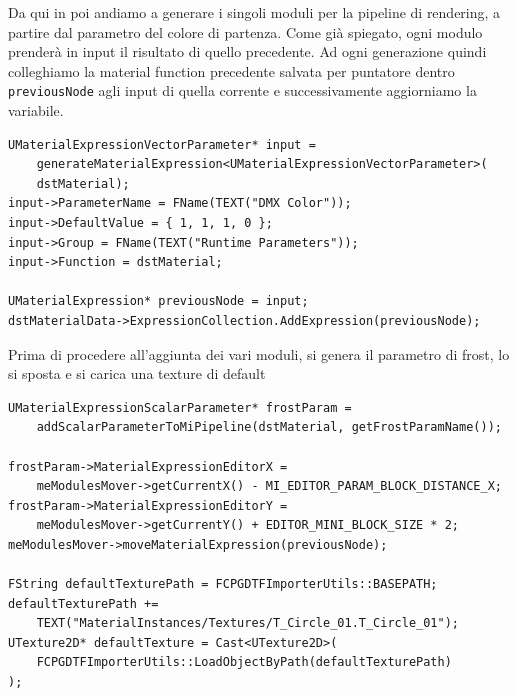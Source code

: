 \documentclass[main.tex]{subfiles}
\begin{document}
Da qui in poi andiamo a generare i singoli moduli per la pipeline di rendering, a partire dal parametro del colore di partenza. Come già spiegato, ogni modulo prenderà in input il risultato di quello precedente. Ad ogni generazione quindi colleghiamo la material function precedente salvata per puntatore dentro \lstinline{previousNode} agli input di quella corrente e successivamente aggiorniamo la variabile.
\begin{lstlisting}
UMaterialExpressionVectorParameter* input =
    generateMaterialExpression<UMaterialExpressionVectorParameter>(
    dstMaterial);
input->ParameterName = FName(TEXT("DMX Color"));
input->DefaultValue = { 1, 1, 1, 0 };
input->Group = FName(TEXT("Runtime Parameters"));
input->Function = dstMaterial;

UMaterialExpression* previousNode = input;
dstMaterialData->ExpressionCollection.AddExpression(previousNode);
\end{lstlisting}
Prima di procedere all'aggiunta dei vari moduli, si genera il parametro di frost, lo si sposta e si carica una texture di default 
\begin{lstlisting}
UMaterialExpressionScalarParameter* frostParam =
    addScalarParameterToMiPipeline(dstMaterial, getFrostParamName());

frostParam->MaterialExpressionEditorX =
    meModulesMover->getCurrentX() - MI_EDITOR_PARAM_BLOCK_DISTANCE_X;
frostParam->MaterialExpressionEditorY =
    meModulesMover->getCurrentY() + EDITOR_MINI_BLOCK_SIZE * 2;
meModulesMover->moveMaterialExpression(previousNode);

FString defaultTexturePath = FCPGDTFImporterUtils::BASEPATH;
defaultTexturePath +=
    TEXT("MaterialInstances/Textures/T_Circle_01.T_Circle_01");
UTexture2D* defaultTexture = Cast<UTexture2D>(
    FCPGDTFImporterUtils::LoadObjectByPath(defaultTexturePath)
);
\end{lstlisting}
\end{document}
